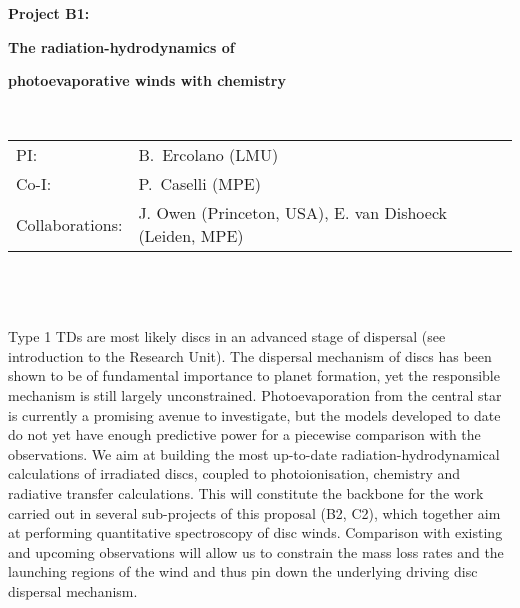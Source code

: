 \documentclass[10pt,fleqn,twoside]{article}
\newcommand{\Tcol}{\color{blue}}
\begin{document}
\newpage


\setcounter{page}{1}

\centerline{\huge\bf\Tcol
%
%
%
%
%
 Project B1:}

\centerline{\huge\bf\Tcol The radiation-hydrodynamics of}

\centerline{\huge\bf\Tcol photoevaporative winds with chemistry}

%
%
%
%
%
\vskip1.0cm

\\
\begin{tabular}{ll}
{\textsf{PI:}}                  & B.~Ercolano (LMU)\\
{\textsf{Co-I:}}                &P.~Caselli (MPE)\\
{\textsf{Collaborations:}}      & J. Owen (Princeton, USA), E. van Dishoeck (Leiden, MPE)  \\
\end{tabular}


\vspace{1em}
 \\

\vspace{1em}
\\

\\
Type 1 TDs are most likely discs in an advanced stage of dispersal
(see introduction to the Research Unit). The
dispersal mechanism of discs has been shown to be of fundamental importance to planet
formation, yet the responsible mechanism is still largely
unconstrained. Photoevaporation from the central star is currently a
promising avenue to investigate, but the models developed to date do
not yet have enough predictive power for a piecewise comparison with
the observations. We aim at building the most
up-to-date radiation-hydrodynamical calculations of irradiated discs, 
coupled to photoionisation, chemistry and radiative transfer
calculations. This will constitute the backbone for the work carried
out in several sub-projects of this proposal (B2, C2), which together
aim at performing quantitative
spectroscopy of disc winds. Comparison with existing and upcoming
observations will allow us to constrain the mass loss rates and the
launching regions of the wind and thus pin down the underlying driving disc
dispersal mechanism. 
\end{document}
